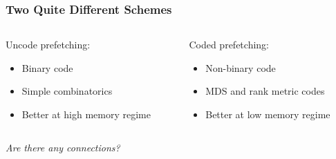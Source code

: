 \documentclass{beamer}
\begin{document}
\begin{frame}
\frametitle{Two Quite Different Schemes}

\begin{columns}
\begin{column}{0.45\textwidth}
Uncode prefetching:  
\begin{itemize}
\item Binary code
\item Simple combinatorics
\item Better at high memory regime
\end{itemize}
  \end{column}

  \begin{column}{0.5\textwidth}
Coded prefetching:  
\begin{itemize} 
\item Non-binary code
\item MDS and rank metric codes
\item Better at low memory regime
\end{itemize}
  \end{column}

\end{columns}

\pause
\vspace{1cm}
\centering
\textit{Are there any connections?}
\end{frame}

\end{document}
